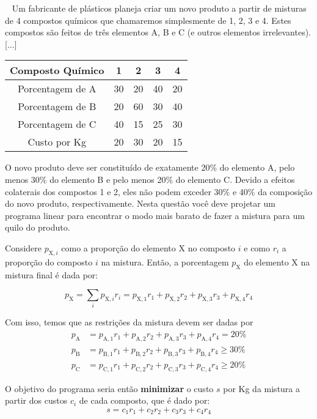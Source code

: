 ~
Um fabricante de plásticos planeja criar um novo produto a partir de misturas de 4 compostos químicos que chamaremos simplesmente de 1, 2, 3 e 4. Estes compostos são feitos de três elementos A, B e C (e outros elementos irrelevantes). [...]

\begin{table}[H]
    \centering
    \begin{tabular}{ccccc}
        \toprule
        Composto Químico & 1 & 2 & 3 & 4 \\
        \midrule
        Porcentagem de A & 30 & 20 & 40 & 20 \\
        Porcentagem de B & 20 & 60 & 30 & 40 \\
        Porcentagem de C & 40 & 15 & 25 & 30 \\
        \midrule
        Custo por Kg & 20 & 30 & 20 & 15 \\
        \bottomrule
    \end{tabular}
\end{table}

O novo produto deve ser constituído de exatamente 20\% do elemento A, pelo menos 30\% do elemento B e pelo menos 20\% do elemento C. Devido a efeitos colaterais dos compostos 1 e 2, eles não podem exceder 30\% e 40\% da composição do novo produto, respectivamente. Nesta questão você deve projetar um programa linear para encontrar o modo mais barato de fazer a mistura para um quilo do produto.

\itemdsep
\def\eA{{\text{A}}}
\def\eB{{\text{B}}}
\def\eC{{\text{C}}}
\def\eX{{\text{X}}}

Considere $p_{\eX,i}$ como a proporção do elemento X no composto $i$ e como $r_i$ a proporção do composto $i$ na mistura. Então, a porcentagem $p_\eX$ do elemento X na mistura final é dada por:

\[
    p_\eX = \sum_{i} p_{\eX,i} r_i
        = p_{\eX,1} r_1 + p_{\eX,2} r_2 + p_{\eX,3} r_3 + p_{\eX,4} r_4
\]

Com isso, temos que as restrições da mistura devem ser dadas por
\begin{align*}
    p_\eA &= p_{\eA,1} r_1 + p_{\eA,2} r_2 + p_{\eA,3} r_3 + p_{\eA,4} r_4 = 20\% \\
    p_\eB &= p_{\eB,1} r_1 + p_{\eB,2} r_2 + p_{\eB,3} r_3 + p_{\eB,4} r_4 \geq 30\% \\
    p_\eC &= p_{\eC,1} r_1 + p_{\eC,2} r_2 + p_{\eC,3} r_3 + p_{\eC,4} r_4 \geq 20\%
\end{align*}

O objetivo do programa seria então \textbf{minimizar} o custo $s$ por Kg da mistura a partir dos custos $c_i$ de cada composto, que é dado por:
\[
    s = c_1 r_1 + c_2 r_2 + c_3 r_3 + c_4 r_4
\]

